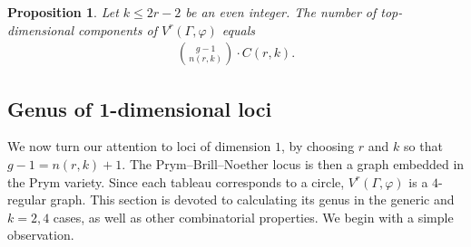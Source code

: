 \documentclass[11pt,reqno]{amsart}
\newcommand{\yoav}[1]{{\color{blue} \sf  Yo$\alpha$v: [#1]}}
\theoremstyle{definition}
\theoremstyle{problem}
\theoremstyle{plain}
\newtheorem{proposition}[definition]{Proposition}
\theoremstyle{remark}
\theoremstyle{theorem}
\numberwithin{equation}{section}
\numberwithin{figure}{section}
\theoremstyle{definition}
\theoremstyle{problem}
\theoremstyle{plain}
\begin{document}
\begin{proposition}
  \label{prop:numcomp}
  Let $k\leq 2r-2$ be an even integer. The number of top-dimensional components of $V^r(\Gamma,\varphi)$ equals 
  \begin{gather*}
  \binom{g-1}{n(r,k)}\cdot C(r,k).
  \end{gather*}
\end{proposition}

% 
  
%
%
%


\subsection{Genus of 1-dimensional loci} %
We now turn our attention to loci of dimension $1$, by choosing $r$ and $k$ so that  $g-1=n(r,k)+1$. The Prym--Brill--Noether locus is then a graph embedded in the Prym variety.  Since each tableau corresponds to a circle, $V^r(\Gamma,\varphi)$ is a $4$-regular graph. This section is devoted to calculating its genus  in the generic and $k=2,4$ cases, as well as other combinatorial properties. We begin with a simple observation.
\end{document}
